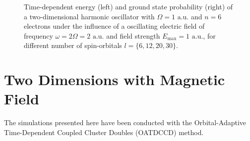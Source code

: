 \begin{figure}[!h]
{\begin{minipage}{0.6\textwidth}
    \end{minipage}
    }
    \caption{Time-dependent energy (left) and ground state probability (right)
        of a two-dimensional harmonic oscillator with $\Omega=1 \text{ a.u.}$
        and $n=6$ electrons under the influence of a oscillating electric field 
        of frequency $\omega = 2 \Omega = 2 \text{ a.u.}$ and field strength
        $E_\text{max}=1 \text{ a.u.}$,
        for different number of spin-orbitals $l=\{6,12,20,30\}$.
    }
    \label{fig:2d_n6_qd}
\end{figure}

\vfill
\pagebreak

\section{Two Dimensions with Magnetic Field}
\label{app:b_field}

The simulations presented here have been conducted with the Orbital-Adaptive 
Time-Dependent Coupled Cluster Doubles (OATDCCD) method. 

